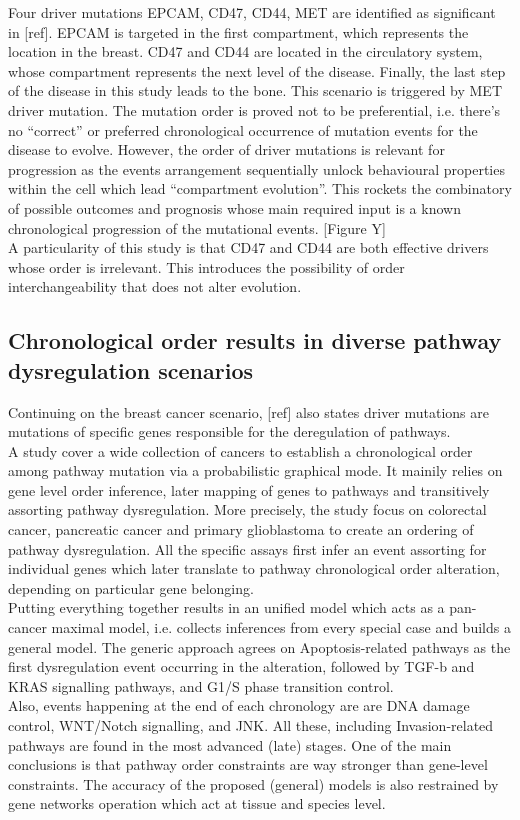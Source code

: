 Four driver mutations {EPCAM, CD47, CD44, MET} are identified as significant in [ref]. EPCAM is targeted in the first compartment, which represents the location in the breast. CD47 and CD44 are located in the circulatory system, whose compartment represents the next level of the disease. Finally, the last step of the disease in this study leads to the bone. This scenario is triggered by MET driver mutation. The mutation order is proved not to be preferential, i.e. there’s no “correct” or preferred chronological occurrence of mutation events for the disease to evolve. However, the order of driver mutations is relevant for progression as the events arrangement sequentially unlock behavioural properties within the cell which lead “compartment evolution”. This rockets the combinatory of possible outcomes and prognosis whose main required input is a known chronological progression of the mutational events. [Figure Y]
\\

A particularity of this study is that CD47 and CD44 are both effective drivers whose order is irrelevant. This introduces the possibility of order interchangeability that does not alter evolution.
\\
\subsection{Chronological order results in diverse pathway dysregulation scenarios}
Continuing on the breast cancer scenario, [ref] also states driver mutations are mutations of specific genes responsible for the deregulation of pathways.
\\

A study \cite{Gerstung2011TheTumorigenesis} cover a wide collection of cancers to establish a chronological order among pathway mutation via a probabilistic graphical mode. It mainily relies on gene level order inference, later mapping of genes to pathways and transitively assorting pathway dysregulation. More precisely, the study focus on colorectal cancer, pancreatic cancer and primary glioblastoma to create an ordering of pathway dysregulation. All the specific assays first infer an event assorting for individual genes which later translate to pathway chronological order alteration, depending on particular gene belonging.\\

Putting everything together results in an unified model which acts as a pan-cancer maximal model, i.e. collects inferences from every special case and builds a general model. The generic approach agrees on Apoptosis-related pathways as the first dysregulation event occurring in the alteration, followed by TGF-b and KRAS signalling pathways, and G1/S phase transition control. \\
Also, events happening at the end of each chronology are are DNA damage control, WNT/Notch signalling, and JNK. All these, including Invasion-related pathways are found in the most advanced (late) stages.
One of the main conclusions is that pathway order constraints are way stronger than gene-level constraints.
The accuracy of the proposed (general) models is also restrained by gene networks operation which act at tissue and species level.
\\

